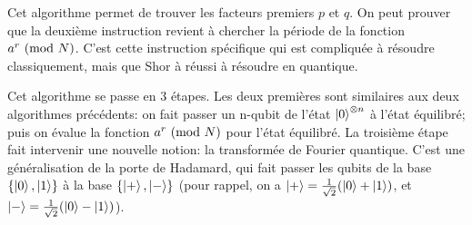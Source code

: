 \begin{algorithm}[H]
  \SetAlgoLined
\end{algorithm}

Cet algorithme permet de trouver les facteurs premiers $p$ et $q$. On peut prouver que la deuxième instruction revient à chercher la période de la fonction $a^r \ (\mathrm{mod}\ N)$. C'est cette instruction spécifique qui est compliquée à résoudre classiquement, mais que Shor à réussi à résoudre en quantique.

Cet algorithme se passe en 3 étapes. Les deux premières sont similaires aux deux algorithmes précédents: on fait passer un n-qubit de l'état $\ket{0}^{\otimes n}$ à l'état équilibré; puis on évalue la fonction $a^r \ (\mathrm{mod}\ N)$ pour l'état équilibré. La troisième étape fait intervenir une nouvelle notion: la transformée de Fourier quantique. C'est une généralisation de la porte de Hadamard, qui fait passer les qubits de la base $\{\ket{0}, \ket{1}\}$ à la base $\{\ket{+}, \ket{-}\}$ (pour rappel, on a $\ket{+} = \frac{1}{\sqrt{2}}(\ket{0} + \ket{1})$, et $\ket{-} = \frac{1}{\sqrt{2}}(\ket{0} - \ket{1})$).

